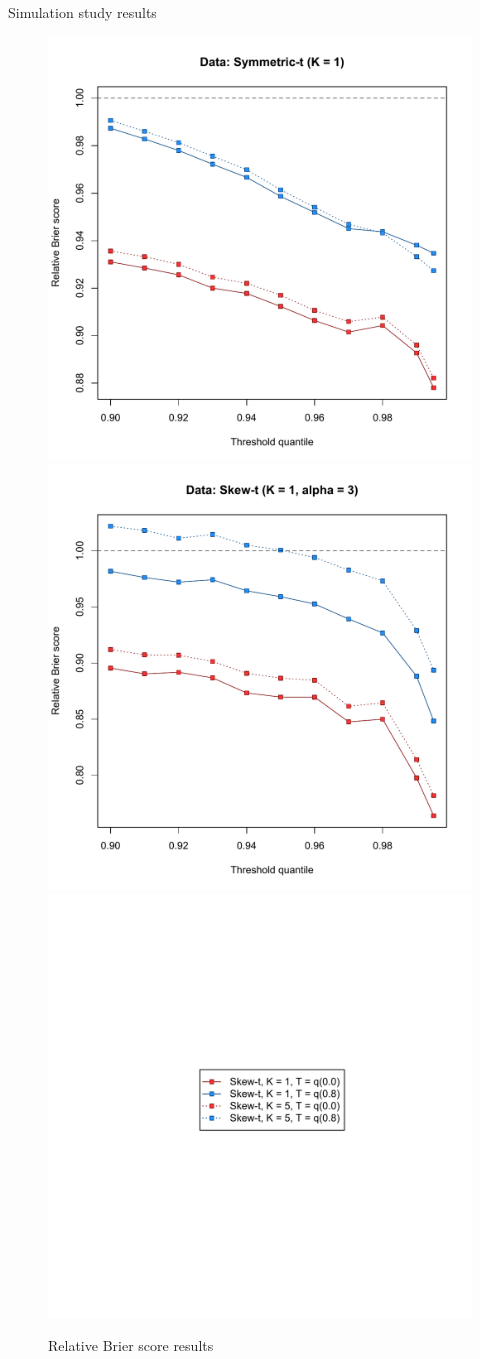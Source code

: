 \documentclass{beamer}
\begin{document}
\begin{frame}{Simulation study results}
\centering
  \begin{figure}
    \includegraphics[width=0.45\linewidth]{./plots/pot/bs-sim-t1.pdf}
    \includegraphics[width=0.45\linewidth]{./plots/pot/bs-sim-st1.pdf} \\
    \includegraphics[width=0.3\linewidth, trim=2in 3.25in 2in 3in]{./plots/pot/bs-sim-legend.pdf}
    \caption{Relative Brier score results}
  \end{figure}
\end{frame}
\end{document}
